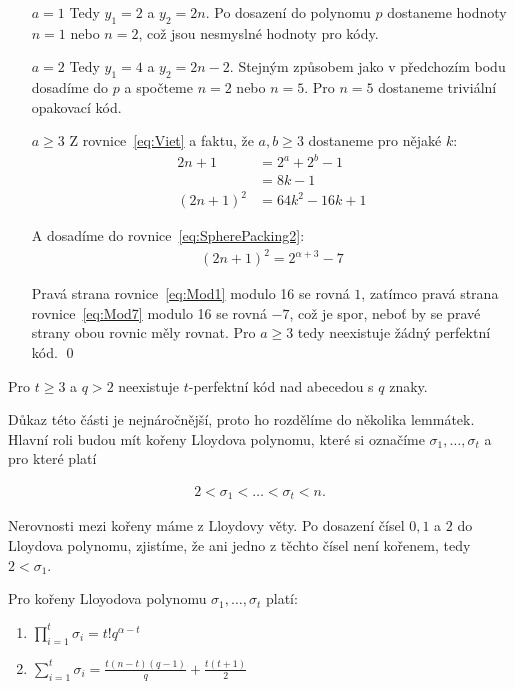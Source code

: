 \begin{itemize}
\item[$a = 1$]
Tedy $y_1 = 2$ a $y_2 = 2n$. Po dosazení do polynomu $p$ dostaneme hodnoty $n = 1$ nebo $n = 2$, což jsou nesmyslné hodnoty pro kódy.
\item[$a = 2$]
Tedy $y_1 = 4$ a $y_2 = 2n -2$. Stejným způsobem jako v předchozím bodu dosadíme do $p$ a spočteme $n = 2$ nebo $n = 5$. Pro $n = 5$ dostaneme triviální opakovací kód.
\item[$a \geq 3$]
Z rovnice~\ref{eq:Viet} a faktu, že $a,b\geq 3$ dostaneme pro nějaké $k$:
\begin{align}
2n + 1 &= 2^a + 2^b - 1 \\
&= 8k - 1 \\
(2n + 1)^2 &= 64k^2 - 16k + 1 \label{eq:Mod1}
\end{align}

A dosadíme do rovnice~\ref{eq:SpherePacking2}:
\begin{align}
(2n + 1)^2 = 2^{\alpha + 3} - 7 \label{eq:Mod7}
\end{align}

Pravá strana rovnice~\ref{eq:Mod1} modulo 16 se rovná $1$, zatímco pravá strana rovnice~\ref{eq:Mod7} modulo 16 se rovná $-7$, což je spor, neboť by se pravé strany obou rovnic měly rovnat. Pro $a \geq 3$ tedy neexistuje žádný perfektní kód. \qed

\end{itemize}

\vt Pro $t \geq 3$ a $q > 2$ neexistuje $t$-perfektní kód nad abecedou s $q$ znaky.

Důkaz této části je nejnáročnější, proto ho rozdělíme do několika lemmátek. Hlavní roli budou mít kořeny Lloydova polynomu, které si označíme $\sigma_1, \dots, \sigma_t$ a pro které platí

\begin{align*}
2 < \sigma_1 < \dots < \sigma_t < n.
\end{align*}

Nerovnosti mezi kořeny máme z Lloydovy věty. Po dosazení čísel $0, 1$ a $2$ do Lloydova polynomu, zjistíme, že ani jedno z těchto čísel není kořenem, tedy $2 < \sigma_1$.

\lm Pro kořeny Lloyodova polynomu $\sigma_1, \dots, \sigma_t$ platí:
\begin{enumerate}
\item $\prod\limits_{i = 1}^{t} \sigma_i = t!q^{\alpha - t}$
\item $\sum\limits_{i = 1}^{t} \sigma_i = \frac{t(n-t)(q-1)}{q} + \frac{t(t+1)}{2}$
\end{enumerate}


